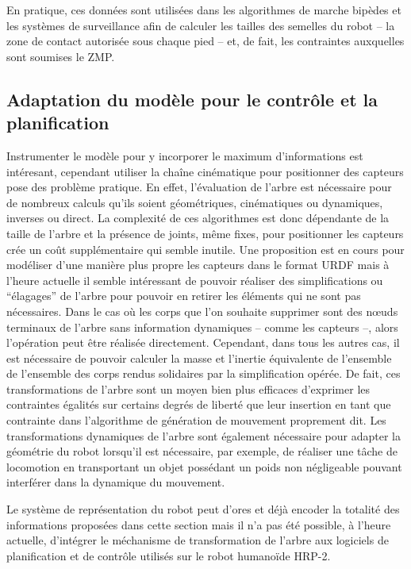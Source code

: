 En pratique, ces données sont utilisées dans les algorithmes de marche
bipèdes et les systèmes de surveillance afin de calculer les tailles
des semelles du robot -- la zone de contact autorisée sous chaque pied
-- et, de fait, les contraintes auxquelles sont soumises le ZMP.


\subsection{Adaptation du modèle pour le contrôle et la planification}

Instrumenter le modèle pour y incorporer le maximum d'informations est
intéresant, cependant utiliser la chaîne cinématique pour positionner
des capteurs pose des problème pratique. En effet, l'évaluation de
l'arbre est nécessaire pour de nombreux calculs qu'ils soient
géométriques, cinématiques ou dynamiques, inverses ou direct. La
complexité de ces algorithmes est donc dépendante de la taille de
l'arbre et la présence de joints, même fixes, pour positionner les
capteurs crée un coût supplémentaire qui semble inutile. Une
proposition est en cours pour modéliser d'une manière plus propre les
capteurs dans le format URDF mais à l'heure actuelle il semble
intéressant de pouvoir réaliser des simplifications ou ``élagages'' de
l'arbre pour pouvoir en retirer les éléments qui ne sont pas
nécessaires. Dans le cas où les corps que l'on souhaite supprimer sont
des n\oe uds terminaux de l'arbre sans information dynamiques -- comme
les capteurs --, alors l'opération peut être réalisée
directement. Cependant, dans tous les autres cas, il est nécessaire de
pouvoir calculer la masse et l'inertie équivalente de l'ensemble de
l'ensemble des corps rendus solidaires par la simplification
opérée. De fait, ces transformations de l'arbre sont un moyen bien
plus efficaces d'exprimer les contraintes égalités sur certains degrés
de liberté que leur insertion en tant que contrainte dans l'algorithme
de génération de mouvement proprement dit. Les transformations
dynamiques de l'arbre sont également nécessaire pour adapter la
géométrie du robot lorsqu'il est nécessaire, par exemple, de réaliser
une tâche de locomotion en transportant un objet possédant un poids
non négligeable pouvant interférer dans la dynamique du mouvement.

Le système de représentation du robot peut d'ores et déjà encoder la
totalité des informations proposées dans cette section mais il n'a pas
été possible, à l'heure actuelle, d'intégrer le méchanisme de
transformation de l'arbre aux logiciels de planification et de
contrôle utilisés sur le robot humanoïde HRP-2.


